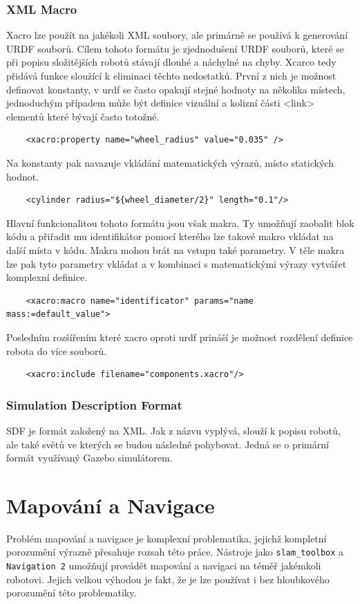 \subsubsection*{XML Macro}
Xacro lze použít na jakékoli XML soubory, ale primárně se používá k generování URDF souborů. Cílem tohoto formátu je zjednodušení URDF souborů, které se při popisu složitějších robotů stávají dlouhé a náchylné na chyby. Xcarco tedy přidává funkce sloužící k eliminaci těchto nedostatků. 
První z nich je možnost definovat konstanty, v urdf se často opakují stejné hodnoty na několika místech, jednoduchým případem může být definice vizuální a kolizní části <link> elementů které bývají často totožné. 
\begin{verbatim}
	<xacro:property name="wheel_radius" value="0.035" />
\end{verbatim}
Na konstanty pak navazuje vkládání matematických výrazů, místo statických hodnot.
\begin{verbatim}
	<cylinder radius="${wheel_diameter/2}" length="0.1"/>
\end{verbatim}
Hlavní funkcionalitou tohoto formátu jsou však makra. Ty umožňují zaobalit blok kódu a přiřadit mu identifikátor pomocí kterého lze takové makro vkládat na další místa v kódu. 
Makra mohou brát na vstupu také parametry. V těle makra lze pak tyto parametry vkládat a v kombinaci s matematickými výrazy vytvářet komplexní definice.
\begin{verbatim}
	<xacro:macro name="identificator" params="name mass:=default_value">
\end{verbatim}
Posledním rozšířením které xacro oproti urdf prináší je možnost rozdělení definice robota do více souborů.
\begin{verbatim}
	<xacro:include filename="components.xacro"/>
\end{verbatim}

\subsubsection*{Simulation Description Format}
SDF je formát založený na XML. Jak z názvu vyplývá, slouží k popisu robotů, ale také světů ve kterých se budou následně pohybovat. Jedná se o primární formát využívaný Gazebo simulátorem.

\section{Mapování a Navigace}
Problém mapování a navigace je komplexní problematika, jejichž kompletní porozumění výrazně přesahuje rozsah této práce. Nástroje jako \verb|slam_toolbox| a \verb|Navigation 2| umožňují provádět mapování a navigaci na téměř jakémkoli robotovi. Jejich velkou výhodou je fakt, že je lze používat i bez hloubkového porozumění této problematiky.

